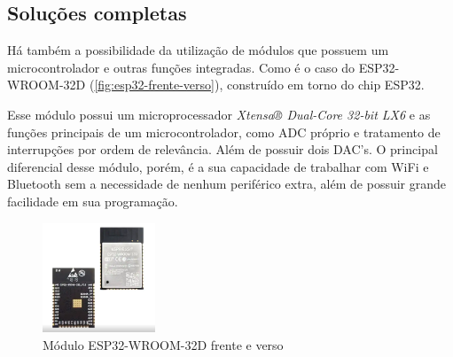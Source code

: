 \subsection{Soluções completas}\label{subsec:solucomp}

Há também a possibilidade da utilização de módulos que possuem um microcontrolador e outras funções integradas. Como é o caso do ESP32-WROOM-32D (\autoref{fig:esp32-frente-verso}), construído em torno do chip ESP32.

Esse módulo possui um microprocessador \textit{Xtensa® Dual-Core 32-bit LX6} e as funções principais de um microcontrolador, como \gls{ADC} próprio e tratamento de interrupções por ordem de relevância. Além de possuir dois \gls{DAC}'s. O principal diferencial desse módulo, porém, é a sua capacidade de trabalhar com WiFi e Bluetooth sem a necessidade de nenhum periférico extra, além de possuir grande facilidade em sua programação. \cite{esp32-datasheet}

\begin{figure}[htb]
    \caption{Módulo ESP32-WROOM-32D frente e verso}
    \label{fig:esp32-frente-verso}
    \includegraphics[width=0.3\textwidth]{figuras/esp32-frente-verso.png}
\end{figure}